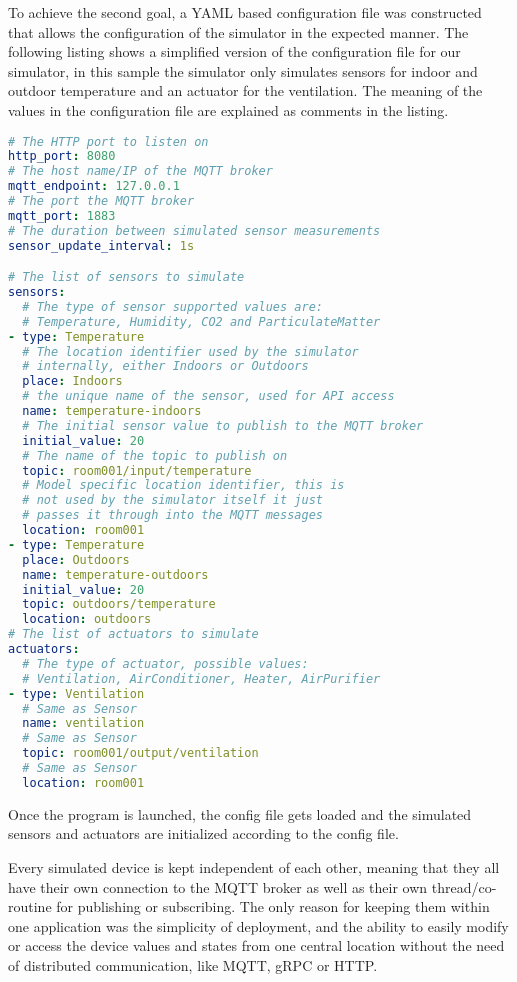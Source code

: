 To achieve the second goal, a YAML based configuration file was
constructed that allows the configuration of the simulator in the
expected manner.
The following listing shows a simplified version of the
configuration file for our simulator, in this sample the simulator only
simulates sensors for indoor and outdoor temperature and an actuator for
the ventilation.
The meaning of the values in the configuration file are explained as comments in the listing.

\begin{lstlisting}[language=yaml]
# The HTTP port to listen on
http_port: 8080
# The host name/IP of the MQTT broker
mqtt_endpoint: 127.0.0.1
# The port the MQTT broker
mqtt_port: 1883
# The duration between simulated sensor measurements
sensor_update_interval: 1s

# The list of sensors to simulate
sensors:
  # The type of sensor supported values are:
  # Temperature, Humidity, CO2 and ParticulateMatter
- type: Temperature
  # The location identifier used by the simulator
  # internally, either Indoors or Outdoors
  place: Indoors
  # the unique name of the sensor, used for API access
  name: temperature-indoors
  # The initial sensor value to publish to the MQTT broker
  initial_value: 20
  # The name of the topic to publish on
  topic: room001/input/temperature
  # Model specific location identifier, this is
  # not used by the simulator itself it just
  # passes it through into the MQTT messages
  location: room001
- type: Temperature
  place: Outdoors
  name: temperature-outdoors
  initial_value: 20
  topic: outdoors/temperature
  location: outdoors
# The list of actuators to simulate
actuators:
  # The type of actuator, possible values:
  # Ventilation, AirConditioner, Heater, AirPurifier
- type: Ventilation
  # Same as Sensor
  name: ventilation
  # Same as Sensor
  topic: room001/output/ventilation
  # Same as Sensor
  location: room001
\end{lstlisting}

Once the program is launched, the config file gets loaded and the
simulated sensors and actuators are initialized according to the config
file.

Every simulated device is kept independent of each other, meaning that
they all have their own connection to the MQTT broker as well as their
own thread/co-routine for publishing or subscribing.
The only reason for
keeping them within one application was the simplicity of deployment, and
the ability to easily modify or access the device values and states from
one central location without the need of distributed communication, like
MQTT, gRPC or HTTP.

